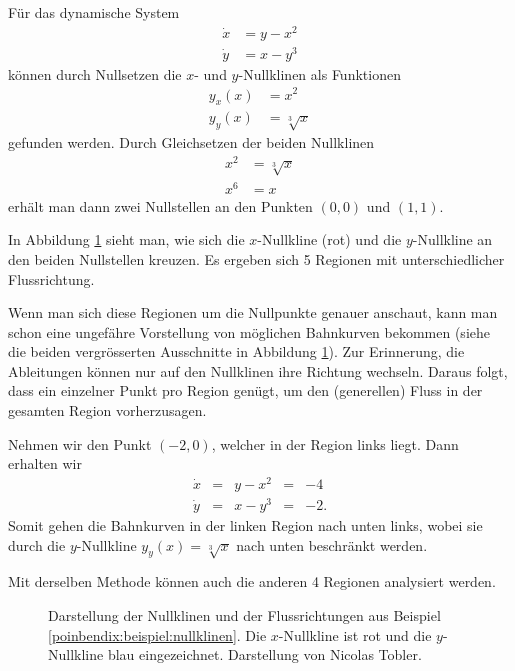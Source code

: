 \begin{beispiel} \label{poinbendix:beispiel:nullklinen}

Für das dynamische System
\begin{align*}
    \dot{x} &= y - x^2 \\
    \dot{y} &= x - y^3
\end{align*}
können durch Nullsetzen die $x$- und $y$-Nullklinen als Funktionen
\begin{align*}
    y_x(x) &= x^2 \\
    y_y(x) &= \sqrt[3]{x}
\end{align*}
gefunden werden.
Durch Gleichsetzen der beiden Nullklinen
\begin{align*}
    x^2 &= \sqrt[3]{x} \\
    x^6 &= x
\end{align*}
erhält man dann zwei Nullstellen an den Punkten $(0, 0)$ und $(1, 1)$.

In Abbildung \ref{poinbendix:fig:nullklinen} sieht man, wie sich die $x$-Nullkline (rot) und die $y$-Nullkline an den beiden Nullstellen kreuzen.
Es ergeben sich 5 Regionen mit unterschiedlicher Flussrichtung.

Wenn man sich diese Regionen um die Nullpunkte genauer anschaut, kann man schon eine ungefähre Vorstellung von möglichen Bahnkurven bekommen (siehe die beiden vergrösserten Ausschnitte in Abbildung \ref{poinbendix:fig:nullklinen}).
Zur Erinnerung, die Ableitungen können nur auf den Nullklinen ihre Richtung wechseln.
Daraus folgt, dass ein einzelner Punkt pro Region genügt, um den (generellen) Fluss in der gesamten Region vorherzusagen.

Nehmen wir den Punkt $(-2, 0)$, welcher in der Region links liegt.
Dann erhalten wir
\[
\begin{array}{rcccl}
\dot{x} &=& y-x^2 &=&-4 \\
\dot{y} &=& x-y^3 &=&-2.
\end{array}
\]
Somit gehen die Bahnkurven in der linken Region nach unten links, wobei sie durch die $y$-Nullkline $y_y(x) = \sqrt[3]{x}$ nach unten beschränkt werden.

Mit derselben Methode können auch die anderen 4 Regionen analysiert werden.
\end{beispiel}

\begin{figure}
    \centering
    
    \caption{Darstellung der Nullklinen und der Flussrichtungen aus Beispiel \ref{poinbendix:beispiel:nullklinen}. Die $x$-Nullkline ist rot und die $y$-Nullkline blau eingezeichnet. Darstellung von Nicolas Tobler.}
    \label{poinbendix:fig:nullklinen}
\end{figure}

